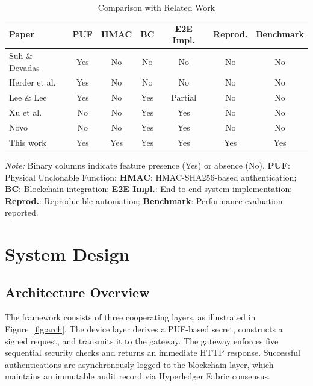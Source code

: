 \documentclass[conference]{IEEEtran}
\begin{document}
\begin{table}[htbp]
\caption{Comparison with Related Work}
\label{tab:related_comparison}
\centering
\footnotesize
\setlength{\tabcolsep}{3pt}
\begin{tabular}{lcccccc}
\toprule
\textbf{Paper} & \textbf{PUF} & \textbf{HMAC} & \textbf{BC} & \textbf{E2E Impl.} & \textbf{Reprod.} & \textbf{Benchmark} \\
\midrule
Suh \& Devadas      & Yes & No  & No  & No      & No  & No  \\
Herder et al.       & Yes & No  & No  & No      & No  & No  \\
Lee \& Lee          & Yes & No  & Yes & Partial & No  & No  \\
Xu et al.           & No  & No  & Yes & Yes     & No  & No  \\
Novo                & No  & No  & Yes & Yes     & No  & No  \\
This work           & Yes & Yes & Yes & Yes     & Yes & Yes \\
\bottomrule
\end{tabular}

\vspace{2pt}
\raggedright
\textit{Note:} Binary columns indicate feature presence (Yes) or absence (No).
\textbf{PUF}: Physical Unclonable Function;
\textbf{HMAC}: HMAC-SHA256-based authentication;
\textbf{BC}: Blockchain integration;
\textbf{E2E Impl.}: End-to-end system implementation;
\textbf{Reprod.}: Reproducible automation;
\textbf{Benchmark}: Performance evaluation reported.
\end{table}

\section{System Design}
\label{sec:design}

\subsection{Architecture Overview}

The framework consists of three cooperating layers, as illustrated in Figure~\ref{fig:arch}. The device layer derives a PUF-based secret, constructs a signed request, and transmits it to the gateway. The gateway enforces five sequential security checks and returns an immediate HTTP response. Successful authentications are asynchronously logged to the blockchain layer, which maintains an immutable audit record via Hyperledger Fabric consensus.
\end{document}
